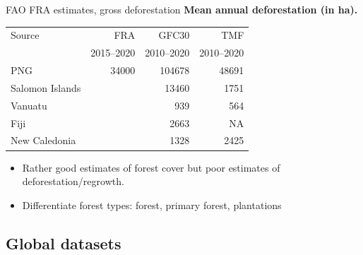 \documentclass[10pt,table,dvipsnames,compress]{beamer}
\begin{document}
\begin{frame}[label={sec:org0e2700e}]{FAO FRA estimates, gross deforestation}
\textbf{Mean annual deforestation (in ha).}

\begin{center}
\begin{tabular}{lrrr}
Source & FRA & GFC30 & TMF\\[0pt]
 & 2015--2020 & 2010--2020 & 2010--2020\\[0pt]
\hline
PNG & 34000 & 104678 & 48691\\[0pt]
Salomon Islands &  & 13460 & 1751\\[0pt]
Vanuatu &  & 939 & 564\\[0pt]
Fiji &  & 2663 & NA\\[0pt]
New Caledonia &  & 1328 & 2425\\[0pt]
\end{tabular}
\end{center}

\begin{itemize}
\item Rather good estimates of forest cover but poor estimates of deforestation/regrowth.
\item Differentiate forest types: forest, primary forest, plantations
\end{itemize}
\end{frame}

\subsection{Global datasets}
\label{sec:org20d92bf}
\end{document}
